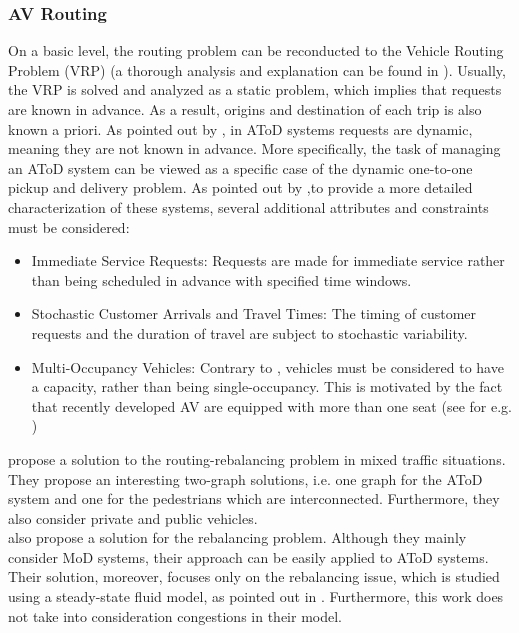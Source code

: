 \subsubsection*{AV Routing}
On a basic level, the routing problem can be reconducted to the Vehicle Routing Problem (VRP) (a thorough analysis and explanation can be found in \cite{doi:10.1137/1.9780898718515}). Usually, the VRP is solved and analyzed as a static problem, which implies that requests are known in advance. As a result, origins and destination of each trip is also known a priori. As pointed out by , in AToD systems requests are dynamic, meaning they are not known in advance. More specifically, the task of managing an AToD system can be viewed as a specific case of the dynamic one-to-one pickup and delivery problem. As pointed out by ,to provide a more detailed characterization of these systems, several additional attributes and constraints must be considered:
\begin{itemize}
	\item Immediate Service Requests: Requests are made for immediate service rather than being scheduled in advance with specified time windows.
	\item Stochastic Customer Arrivals and Travel Times: The timing of customer requests and the duration of travel are subject to stochastic variability.
	\item Multi-Occupancy Vehicles: Contrary to \cite{zhang2016}, vehicles must be considered to have a capacity, rather than being single-occupancy. This is motivated by the fact that recently developed AV are equipped with more than one seat (see for e.g. \cite{dlr-nemo-bili})
\end{itemize}

 propose a solution to the routing-rebalancing problem in mixed traffic situations. They propose an interesting two-graph solutions, i.e. one graph for the AToD system and one for the pedestrians which are interconnected. Furthermore, they also consider private and public vehicles. \\
 also propose a solution for the rebalancing problem. Although they mainly consider MoD systems, their approach can be easily applied to AToD systems. Their solution, moreover, focuses only on the rebalancing issue, which is studied using a steady-state fluid model, as pointed out in \cite{9294258}. Furthermore, this work does not take into consideration congestions in their model. \\


